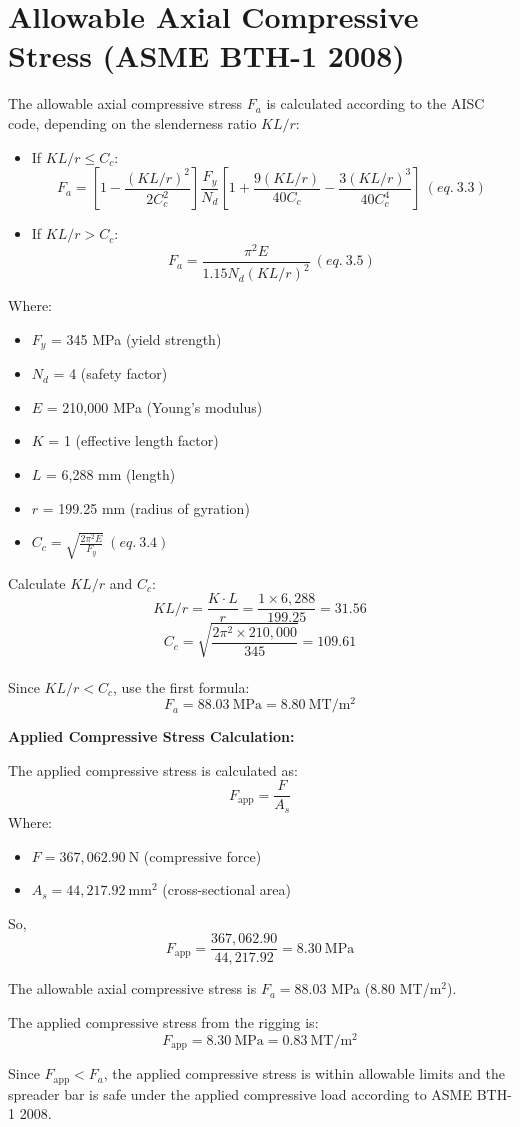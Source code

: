 \documentclass[12pt]{article}
\begin{document}
\section{Allowable Axial Compressive Stress (ASME BTH-1 2008)}

The allowable axial compressive stress $F_a$ is calculated according to the AISC code, depending on the slenderness ratio $KL/r$:

\begin{itemize}
  \item If $KL/r \leq C_c$:
  \[
  F_a = \left[1 - \frac{(KL/r)^2}{2C_c^2}\right] \frac{F_y}{N_d} \left[1 + \frac{9(KL/r)}{40C_c} - \frac{3(KL/r)^3}{40C_c^4}\right] \ (eq. \ 3.3)
  \]
  \item If $KL/r > C_c$:
  \[
  F_a = \frac{\pi^2 E}{1.15 N_d (KL/r)^2} \ (eq. \ 3.5)
  \]
\end{itemize}

Where:
\begin{itemize}
  \item $F_y$ = 345 MPa (yield strength)
  \item $N_d$ = 4 (safety factor)
  \item $E$ = 210,000 MPa (Young's modulus)
  \item $K$ = 1 (effective length factor)
  \item $L$ = 6,288 mm (length)
  \item $r$ = 199.25 mm (radius of gyration)
  \item $C_c = \sqrt{\frac{2\pi^2 E}{F_y}} \ (eq. \ 3.4)$ 
\end{itemize}

Calculate $KL/r$ and $C_c$:
\[
KL/r = \frac{K \cdot L}{r} = \frac{1 \times 6,288}{199.25} = 31.56
\]
\[
C_c = \sqrt{\frac{2\pi^2 \times 210,000}{345}} = 109.61
\]
\\
Since $KL/r < C_c$, use the first formula:
\[
F_a = 88.03\ \mathrm{MPa} = 8.80\ \mathrm{MT/m^2}
\]

\textbf{Applied Compressive Stress Calculation:}

The applied compressive stress is calculated as:
\[
F_{\text{app}} = \frac{F}{A_s}
\]
Where:
\begin{itemize}
  \item $F = 367,062.90\ \mathrm{N}$ (compressive force)
  \item $A_s = 44,217.92\ \mathrm{mm}^2$ (cross-sectional area)
\end{itemize}
So,
\[
F_{\text{app}} = \frac{367,062.90}{44,217.92} = 8.30\ \mathrm{MPa}
\]

The allowable axial compressive stress is $F_a = 88.03$ MPa ($8.80$ MT/m$^2$).

The applied compressive stress from the rigging is:
\[
F_{\text{app}} = 8.30\ \mathrm{MPa} = 0.83\ \mathrm{MT/m^2}
\]

Since $F_{\text{app}} < F_a$, the applied compressive stress is within allowable limits and the spreader bar is safe under the applied compressive load according to ASME BTH-1 2008.
\end{document}
